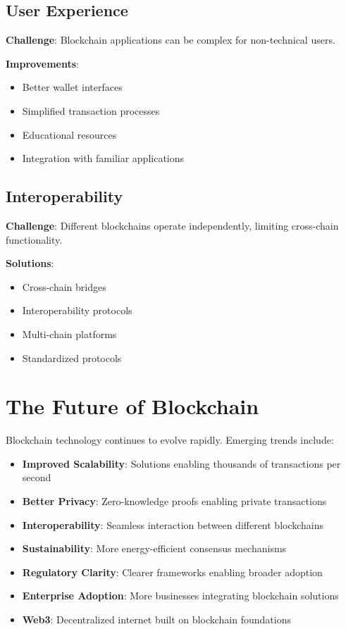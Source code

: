\needspace{3in}
\subsection{User Experience}
\label{subsec:user-experience}

\textbf{Challenge}: Blockchain applications can be complex for non-technical users.

\textbf{Improvements}:
\begin{itemize}
  \item Better wallet interfaces
  \item Simplified transaction processes
  \item Educational resources
  \item Integration with familiar applications
\end{itemize}

\subsection{Interoperability}
\label{subsec:interoperability}

\textbf{Challenge}: Different blockchains operate independently, limiting cross-chain functionality.

\textbf{Solutions}:
\begin{itemize}
  \item Cross-chain bridges
  \item Interoperability protocols
  \item Multi-chain platforms
  \item Standardized protocols
\end{itemize}

\section{The Future of Blockchain}
\label{sec:future}

Blockchain technology continues to evolve rapidly. Emerging trends include:

\begin{itemize}
  \item \textbf{Improved Scalability}: Solutions enabling thousands of transactions per second
  \item \textbf{Better Privacy}: Zero-knowledge proofs enabling private transactions
  \item \textbf{Interoperability}: Seamless interaction between different blockchains
  \item \textbf{Sustainability}: More energy-efficient consensus mechanisms
  \item \textbf{Regulatory Clarity}: Clearer frameworks enabling broader adoption
  \item \textbf{Enterprise Adoption}: More businesses integrating blockchain solutions
  \item \textbf{Web3}: Decentralized internet built on blockchain foundations
\end{itemize}

